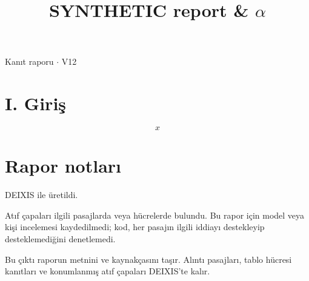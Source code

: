 \documentclass[journal]{IEEEtran}
\begin{document}
\renewcommand{\abstractname}{Özet}
\renewcommand{\IEEEkeywordsname}{Dizin Terimleri}
\renewcommand{\refname}{Kaynaklar}

\title{SYNTHETIC report \& \ensuremath{\alpha}}

\maketitle

\noindent Kanıt raporu \ensuremath{\cdot} V12

\section*{I. Giriş}

\begin{equation*}
x
\end{equation*}
\cite{Synth26}

\section*{Rapor notları}

DEIXIS ile üretildi.

Atıf çapaları ilgili pasajlarda veya hücrelerde bulundu. Bu rapor için model veya kişi incelemesi kaydedilmedi; kod, her pasajın ilgili iddiayı destekleyip desteklemediğini denetlemedi.

Bu çıktı raporun metnini ve kaynakçasını taşır. Alıntı pasajları, tablo hücresi kanıtları ve konumlanmış atıf çapaları DEIXIS'te kalır.




\end{document}
